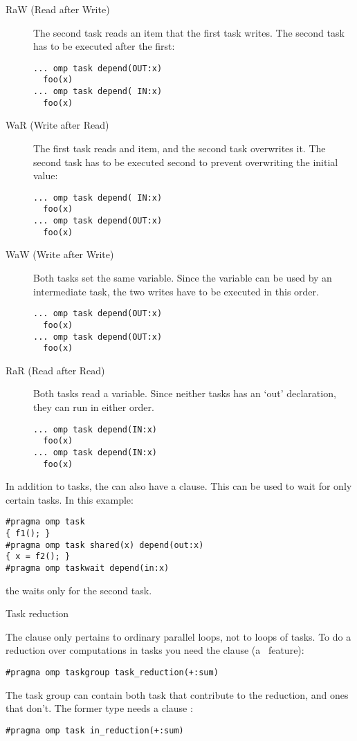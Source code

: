 \begin{description}
\item[RaW (Read after Write)] The second task reads an item that the
  first task writes. The second task has to be executed after the
  first:
\begin{lstlisting}
... omp task depend(OUT:x)
  foo(x)
... omp task depend( IN:x)
  foo(x)
\end{lstlisting}
\item[WaR (Write after Read)] The first task reads and item, and the
  second task overwrites it. The second task has to be executed second
  to prevent overwriting the initial value:
\begin{lstlisting}
... omp task depend( IN:x)
  foo(x)
... omp task depend(OUT:x)
  foo(x)
\end{lstlisting}
\item[WaW (Write after Write)] Both tasks set the same variable. Since
  the variable can be used by an intermediate task, the two writes
  have to be executed in this order.
\begin{lstlisting}
... omp task depend(OUT:x)
  foo(x)
... omp task depend(OUT:x)
  foo(x)
\end{lstlisting}
\item[RaR (Read after Read)] Both tasks read a variable. Since neither
  tasks has an `out' declaration, they can run in either order.
\begin{lstlisting}
... omp task depend(IN:x)
  foo(x)
... omp task depend(IN:x)
  foo(x)
\end{lstlisting}
\end{description}

In addition to tasks, the  can also
have a  clause.
This can be used to wait for only certain tasks.
In this example:
\begin{lstlisting}
#pragma omp task 
{ f1(); }
#pragma omp task shared(x) depend(out:x)
{ x = f2(); }
#pragma omp taskwait depend(in:x)
\end{lstlisting}
the  waits only for the second task.

 {Task reduction}

The  clause only pertains to ordinary parallel loops,
not to  loops of tasks.
To do a reduction over computations in tasks you need the
 clause
(a~ feature):
\begin{lstlisting}
#pragma omp taskgroup task_reduction(+:sum)
\end{lstlisting}
The task group can contain both task that contribute to the reduction,
and ones that don't. The former type needs a clause :
\begin{lstlisting}
#pragma omp task in_reduction(+:sum)
\end{lstlisting}

